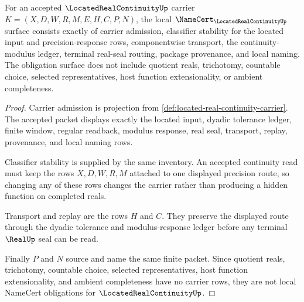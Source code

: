 \begin{theorem}
\label{thm:located-real-continuity-namecert-obligations}
For an accepted $\LocatedRealContinuityUp$ carrier $K=(X,D,W,R,M,E,H,C,P,N)$, the local $\NameCert_{\LocatedRealContinuityUp}$ surface consists exactly of carrier admission, classifier stability for the located input and precision-response rows, componentwise transport, the continuity-modulus ledger, terminal real-seal routing, package provenance, and local naming. The obligation surface does not include quotient reals, trichotomy, countable choice, selected representatives, host function extensionality, or ambient completeness.
\end{theorem}
\begin{proof}
Carrier admission is projection from \autoref{def:located-real-continuity-carrier}. The accepted packet displays exactly the located input, dyadic tolerance ledger, finite window, regular readback, modulus response, real seal, transport, replay, provenance, and local naming rows.

Classifier stability is supplied by the same inventory. An accepted continuity read must keep the rows $X,D,W,R,M$ attached to one displayed precision route, so changing any of these rows changes the carrier rather than producing a hidden function on completed reals.

Transport and replay are the rows $H$ and $C$. They preserve the displayed route through the dyadic tolerance and modulus-response ledger before any terminal $\RealUp$ seal can be read.

Finally $P$ and $N$ source and name the same finite packet. Since quotient reals, trichotomy, countable choice, selected representatives, host function extensionality, and ambient completeness have no carrier rows, they are not local NameCert obligations for $\LocatedRealContinuityUp$.
\end{proof}


\begin{closurestatus}{\LocatedRealContinuityUp}
  \theoryclosure{\seedClosure}
  \formalstatus{\unformalizedV}
\end{closurestatus}
